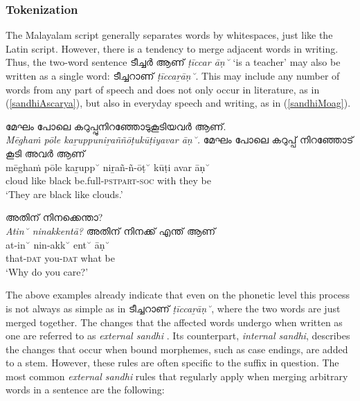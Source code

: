 \documentclass[a4paper]{article}
\newcommand{\afx}[1]{\textsc{#1}}
\begin{document}
\subsubsection{Tokenization}

The Malayalam script generally separates words by whitespaces, just like the Latin script. However, there is a tendency to merge adjacent words in writing. Thus, the two-word sentence ടീച്ചർ ആണ് \textit{ṭīccar āṇ˘} `is a teacher' may also be written as a single word: ടീച്ചറാണ് \textit{ṭīccaṟāṇ˘}. This may include any number of words from any part of speech and does not only occur in literature, as in (\ref{sandhiAscarya}), but also in everyday speech and writing, as in (\ref{sandhiMoag}).

\begin{exe}
\ex\label{sandhiAscarya}
മേഘം പോലെ കറുപ്പുനിറഞ്ഞോടുകൂടിയവർ ആണ്. \\
\textit{Mēghaṁ pōle kaṟuppuniṟaññōṭukūṭiyavar āṇ˘.}
\glll
മേഘം പോലെ കറുപ്പ് നിറഞ്ഞോട് കൂടി അവർ ആണ് \\
mēghaṁ pōle kaṟupp˘ niṟañ-ñ-ōṭ˘ kūṭi avar āṇ˘ \\
cloud like black be.full-\afx{pstpart}-\afx{soc} with they be \\
\trans `They are black like clouds.' \parencite[p.~179]{ascaryacudamani}
\end{exe}


\begin{exe}
\ex\label{sandhiMoag}
അതിന് നിനക്കെന്താ? \\
\textit{Atin˘ ninakkentā?}
\glll
അതിന് നിനക്ക് എന്ത് ആണ് \\
at-in˘ nin-akk˘ ent˘ āṇ˘ \\
that-\afx{dat} you-\afx{dat} what be \\
\trans `Why do you care?' \parencite[p.~165]{moag}
\end{exe}

The above examples already indicate that even on the phonetic level this process is not always as simple as in ടീച്ചറാണ് \textit{ṭīccaṟāṇ˘}, where the two words are just merged together. The changes that the affected words undergo when written as one are referred to as \textit{external sandhi} \parencite{devadath2014sandhi}. Its counterpart, \textit{internal sandhi}, describes the changes that occur when bound morphemes, such as case endings, are added to a stem. However, these rules are often specific to the suffix in question. The most common \textit{external sandhi} rules that regularly apply when merging arbitrary words in a sentence are the following:
\end{document}

